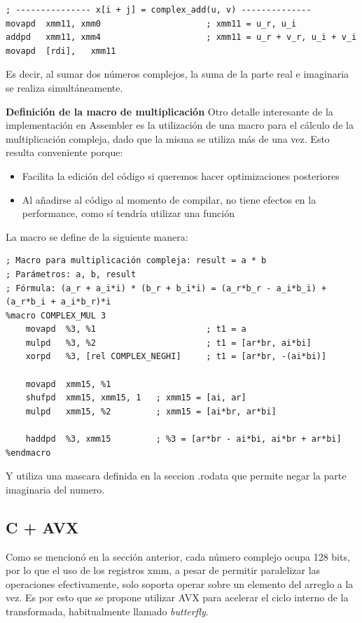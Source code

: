 \documentclass[a4paper]{article}
\begin{document}
\begin{verbatim}
; --------------- x[i + j] = complex_add(u, v) --------------
movapd  xmm11, xmm0                     ; xmm11 = u_r, u_i
addpd   xmm11, xmm4                     ; xmm11 = u_r + v_r, u_i + v_i
movapd  [rdi],   xmm11
\end{verbatim}

Es decir, al sumar dos números complejos, la suma de la parte real e imaginaria se realiza simultáneamente.

\textbf{Definición de la macro de multiplicación}
Otro detalle interesante de la implementación en Assembler es la utilización de una macro para el cálculo de la multiplicación compleja, dado que la misma se utiliza más de una vez. Esto resulta conveniente porque:

\begin{itemize}
    \item Facilita la edición del código si queremos hacer optimizaciones posteriores
    \item Al añadirse al código al momento de compilar, no tiene efectos en la performance, como sí tendría utilizar una función
\end{itemize}

La macro se define de la siguiente manera:

\begin{verbatim}
; Macro para multiplicación compleja: result = a * b
; Parámetros: a, b, result
; Fórmula: (a_r + a_i*i) * (b_r + b_i*i) = (a_r*b_r - a_i*b_i) + (a_r*b_i + a_i*b_r)*i
%macro COMPLEX_MUL 3
    movapd  %3, %1                      ; t1 = a
    mulpd   %3, %2                      ; t1 = [ar*br, ai*bi]
    xorpd   %3, [rel COMPLEX_NEGHI]     ; t1 = [ar*br, -(ai*bi)]

    movapd  xmm15, %1
    shufpd  xmm15, xmm15, 1   ; xmm15 = [ai, ar]
    mulpd   xmm15, %2         ; xmm15 = [ai*br, ar*bi]

    haddpd  %3, xmm15         ; %3 = [ar*br - ai*bi, ai*br + ar*bi]
%endmacro
\end{verbatim}

Y utiliza una mascara definida en la seccion .rodata que permite negar la parte imaginaria del numero.

\subsection{C + AVX}
Como se mencionó en la sección anterior, cada número complejo ocupa 128 bits, por lo que el uso de los registros xmm, a pesar de permitir paralelizar las operaciones efectivamente, solo soporta operar sobre un elemento del arreglo a la vez. Es por esto que se propone utilizar AVX para acelerar el ciclo interno de la transformada, habitualmente llamado \textit{butterfly}.
\end{document}
